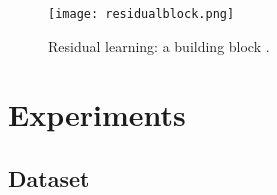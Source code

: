 \documentclass[a4paper]{article}
\begin{document}
\begin{figure}[t]
  \centering
  \texttt{[image: residualblock.png]}
  \caption{Residual learning: a building block \cite{resnet}.}
  \label{fig:residualblock}
\end{figure}


\section{Experiments}

\subsection{Dataset}

\begin{table}[ht]
\caption{Number  of  non-overlapping  target  speakers  and  number  of  utterances  in  training  and development sets of the ASVspoof 2019 database \cite{evaluation}.}
\label{tab:dataset}
\centering
{}
\end{table}
\end{document}
